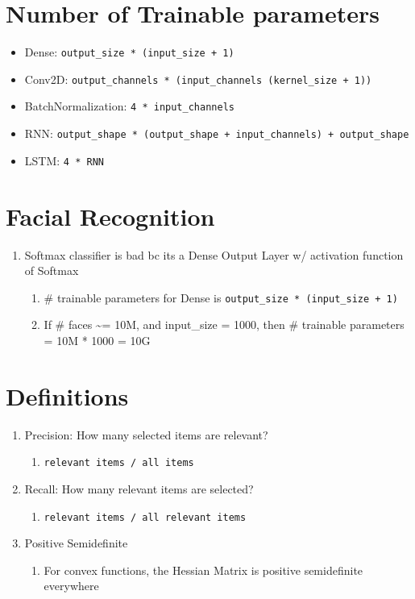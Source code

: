 \documentclass[11pt]{article}
\begin{document}
\section{Number of Trainable parameters}
\label{sec:orgf7a2b1e}

\begin{itemize}
\item Dense: \texttt{output\_size * (input\_size + 1)}
\item Conv2D: \texttt{output\_channels * (input\_channels (kernel\_size + 1))}
\item BatchNormalization: \texttt{4 * input\_channels}
\item RNN: \texttt{output\_shape * (output\_shape + input\_channels) + output\_shape}
\item LSTM: \texttt{4 * RNN}
\end{itemize}



\section{Facial Recognition}
\label{sec:orgcc702f9}

\begin{enumerate}
\item Softmax classifier is bad bc its a Dense Output Layer w/ activation function of Softmax
\begin{enumerate}
\item \# trainable parameters for Dense is \texttt{output\_size * (input\_size + 1)}
\item If \# faces \textasciitilde{}= 10M, and input\_size = 1000, then \# trainable parameters = 10M * 1000 = 10G
\end{enumerate}
\end{enumerate}

\section{Definitions}
\label{sec:org77120d6}

\begin{enumerate}
\item Precision: How many selected items are relevant?
\begin{enumerate}
\item \texttt{relevant items / all items}
\end{enumerate}
\item Recall: How many relevant items are selected?
\begin{enumerate}
\item \texttt{relevant items / all relevant items}
\end{enumerate}
\item Positive Semidefinite
\begin{enumerate}
\item For convex functions, the Hessian Matrix is positive semidefinite everywhere
\end{enumerate}
\end{enumerate}
\end{document}

